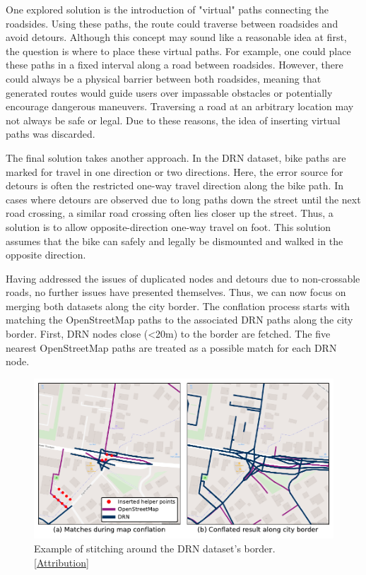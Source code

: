 One explored solution is the introduction of "virtual" paths connecting the roadsides. Using these paths, the route could traverse between roadsides and avoid detours. Although this concept may sound like a reasonable idea at first, the question is where to place these virtual paths. For example, one could place these paths in a fixed interval along a road between roadsides. However, there could always be a physical barrier between both roadsides, meaning that generated routes would guide users over impassable obstacles or potentially encourage dangerous maneuvers. Traversing a road at an arbitrary location may not always be safe or legal. Due to these reasons, the idea of inserting virtual paths was discarded.

The final solution takes another approach. In the DRN dataset, bike paths are marked for travel in one direction or two directions. Here, the error source for detours is often the restricted one-way travel direction along the bike path. In cases where detours are observed due to long paths down the street until the next road crossing, a similar road crossing often lies closer up the street. Thus, a solution is to allow opposite-direction one-way travel on foot. This solution assumes that the bike can safely and legally be dismounted and walked in the opposite direction.

Having addressed the issues of duplicated nodes and detours due to non-crossable roads, no further issues have presented themselves. Thus, we can now focus on merging both datasets along the city border. The conflation process starts with matching the OpenStreetMap paths to the associated DRN paths along the city border. First, DRN nodes close (<20m) to the border are fetched. The five nearest OpenStreetMap paths are treated as a possible match for each DRN node. 

\begin{figure}[t]
\centering
\includegraphics[width=\linewidth]{images/routing-drn-osm-border.pdf}
\caption{Example of stitching around the DRN dataset's border. [\hyperref[attribution]{Attribution}]}
\label{fig:routing-drn-osm-border}
\end{figure}

